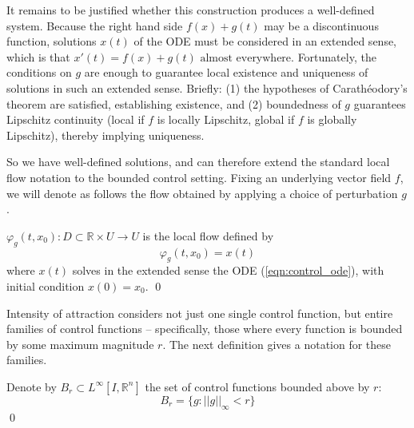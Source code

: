 It remains to be justified whether this construction produces a well-defined system. Because the right hand side $f(x) + g(t)$ may be a discontinuous function, solutions $x(t)$ of the ODE must be considered in an extended sense, which is that $x'(t) = f(x) + g(t) \text{ almost everywhere.}$ Fortunately, the conditions on $g$ are enough to guarantee local existence and uniqueness of solutions in such an extended sense. Briefly: (1) the hypotheses of Carath\'eodory's theorem are satisfied, establishing existence, and (2) boundedness of $g$ guarantees Lipschitz continuity (local if $f$ is locally Lipschitz, global if $f$ is globally Lipschitz), thereby implying uniqueness. 

So we have well-defined solutions, and can therefore extend the standard local flow notation to the bounded control setting. Fixing an underlying vector field $f$, we will denote as follows the flow obtained by applying a choice of perturbation $g$.

\begin{definition} 
	$\varphi_g(t, x_0): D \subset \mathbb{R} \times U \to U$ is the local flow defined by $$\varphi_g(t, x_0) = x(t)$$ where $x(t)$ solves in the extended sense the ODE (\ref{eqn:control_ode}), with initial condition $x(0) = x_0$. \qed
\end{definition}

Intensity of attraction considers not just one single control function, but entire families of control functions -- specifically, those where every function is bounded by some maximum magnitude $r$. %
The next definition gives a notation for these families.


\begin{definition}
	Denote by $B_r \subset L^\infty[I, \mathbb{R}^n]$ the set of control functions bounded above by $r$:
	$$B_r = \{g  : ||g||_\infty < r\}$$ \qed
\end{definition}



